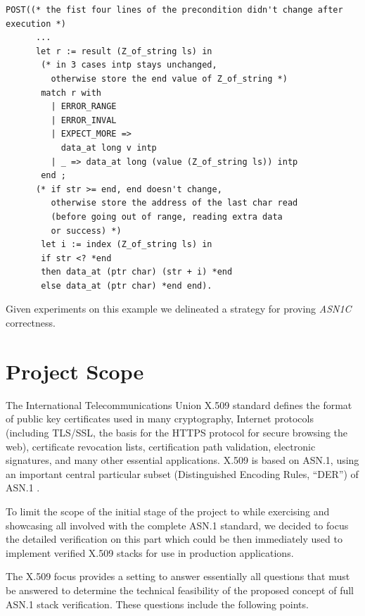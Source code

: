 \documentclass[acmsmall,nonacm]{acmart}
\begin{document}
\begin{lstlisting}[language=Coq]
 POST((* the fist four lines of the precondition didn't change after execution *)
      ... 
      let r := result (Z_of_string ls) in
       (* in 3 cases intp stays unchanged,
         otherwise store the end value of Z_of_string *)
       match r with 
         | ERROR_RANGE 
         | ERROR_INVAL 
         | EXPECT_MORE => 
           data_at long v intp
         | _ => data_at long (value (Z_of_string ls)) intp 
       end ;
      (* if str >= end, end doesn't change, 
         otherwise store the address of the last char read 
         (before going out of range, reading extra data 
         or success) *)
       let i := index (Z_of_string ls) in
       if str <? *end
       then data_at (ptr char) (str + i) *end
       else data_at (ptr char) *end end).
\end{lstlisting}

Given experiments on this example we delineated a strategy for proving
\emph{ASN1C} correctness.

\section{Project Scope}

The International Telecommunications Union X.509 standard
\cite{X509} defines the format of public key certificates used in
many cryptography, Internet protocols (including TLS/SSL, the basis
for the HTTPS protocol for secure browsing the web), certificate
revocation lists, certification path validation, electronic
signatures, and many other essential applications. X.509 is based on
ASN.1, using an important central particular subset (Distinguished
Encoding Rules, ``DER'') of ASN.1 \cite{BERandDER}.

To limit the scope of the initial stage of the project to while
exercising and showcasing all involved with the complete ASN.1
standard, we decided to focus the detailed verification on this part
which could be then immediately used to implement verified X.509
stacks for use in production applications.
 
The X.509 focus provides a setting to answer essentially all questions
that must be answered to determine the technical feasibility of the
proposed concept of full ASN.1 stack verification. These questions
include the following points.
\end{document}
